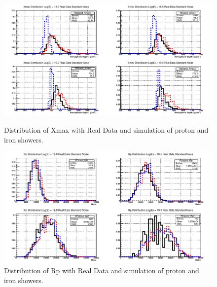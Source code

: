 \begin{figure}
\centering
\includegraphics[width=\textwidth]{chapters/graphs/SelectionEff/RealDataAndSim_XmaxDistComp.pdf}
\caption{Distribution of Xmax with Real Data and simulation of proton and iron showers.}
\vspace{3mm}
\includegraphics[width=\textwidth]{chapters/graphs/SelectionEff/RealDataAndSim_RpDistComp.pdf}
\caption{Distribution of Rp with Real Data and simulation of proton and iron showers.}
\end{figure}

